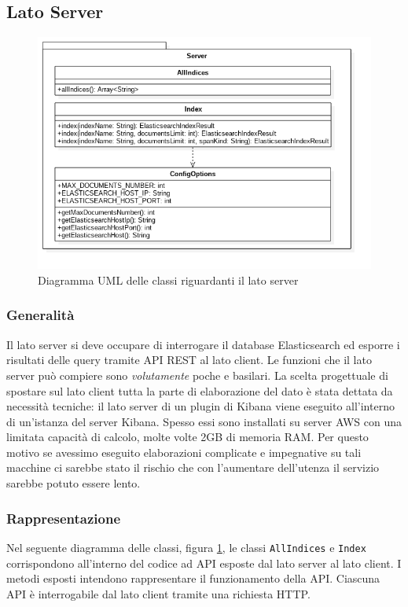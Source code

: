 \subsection{Lato Server}
\label{sec:latoServer}
\begin{figure}[H]
	\centering
	\includegraphics[width=1\textwidth]{Images/DiagrammaClassiServer.png}
	\caption{Diagramma UML delle classi riguardanti il lato server}
	\label{img:diagrammaClassiServer}
\end{figure}
\subsubsection{Generalità}
Il lato server si deve occupare di interrogare il database Elasticsearch ed esporre i risultati delle query tramite API REST al lato client. Le funzioni che il lato server può compiere sono \emph{volutamente}  poche e basilari. La scelta progettuale di spostare sul lato client tutta la parte di elaborazione del dato è stata dettata da necessità tecniche: il lato server di un plugin di Kibana viene eseguito all'interno di un'istanza del server Kibana. Spesso essi sono installati su server AWS con una limitata capacità di calcolo, molte volte 2GB di memoria RAM. Per questo motivo se avessimo eseguito elaborazioni complicate e impegnative su tali macchine ci sarebbe stato il rischio che con l'aumentare dell'utenza il servizio sarebbe potuto essere lento.

\subsubsection{Rappresentazione}
Nel seguente diagramma delle classi, figura \ref{img:diagrammaClassiServer}, le classi \texttt{AllIndices} e \texttt{Index} corrispondono all'interno del codice ad API esposte dal lato server al lato client. I metodi esposti intendono rappresentare il funzionamento della API. Ciascuna API è interrogabile dal lato client tramite una richiesta HTTP.


